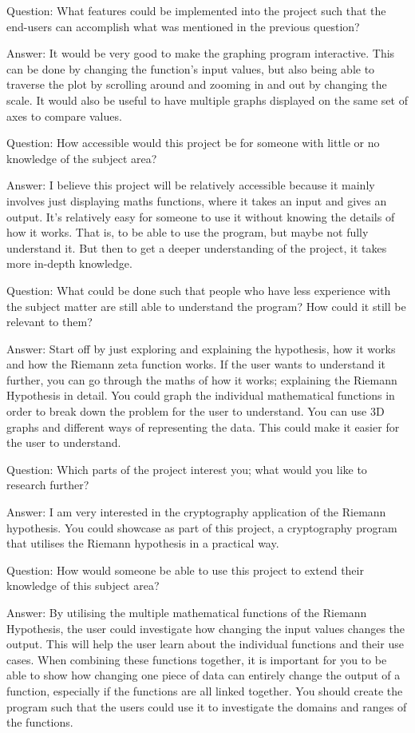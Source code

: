 \documentclass{article}
\begin{document}
Question: What features could be implemented into the project such that the end-users can accomplish what was mentioned in the previous question?

Answer: It would be very good to make the graphing program interactive. This can be done by changing the function’s input values, but also being able to traverse the plot by scrolling around and zooming in and out by changing the scale. It would also be useful to have multiple graphs displayed on the same set of axes to compare values.

Question: How accessible would this project be for someone with little or no knowledge of the subject area?

Answer: I believe this project will be relatively accessible because it mainly involves just displaying maths functions, where it takes an input and gives an output. It's relatively easy for someone to use it without knowing the details of how it works. That is, to be able to use the program, but maybe not fully understand it. But then to get a deeper understanding of the project, it takes more in-depth knowledge.

Question: What could be done such that people who have less experience with the subject matter are still able to understand the program? How could it still be relevant to them?

Answer: Start off by just exploring and explaining the hypothesis, how it works and how the Riemann zeta function works. If the user wants to understand it further, you can go through the maths of how it works; explaining the Riemann Hypothesis in detail. You could graph the individual mathematical functions in order to break down the problem for the user to understand.  You can use 3D graphs and different ways of representing the data. This could make it easier for the user to understand.

Question: Which parts of the project interest you; what would you like to research further?

Answer: I am very interested in the cryptography application of the Riemann hypothesis. You could showcase as part of this project, a cryptography program that utilises the Riemann hypothesis in a practical way.

Question: How would someone be able to use this project to extend their knowledge of this subject area?

Answer: By utilising the multiple mathematical functions of the Riemann Hypothesis, the user could investigate how changing the input values changes the output. This will help the user learn about the individual functions and their use cases. When combining these functions together, it is important for you to be able to show how changing one piece of data can entirely change the output of a function, especially if the functions are all linked together. You should create the program such that the users could use it to investigate the domains and ranges of the functions.
\end{document}
